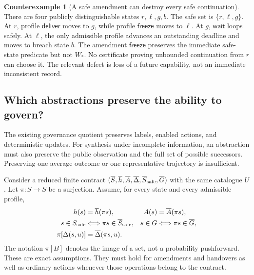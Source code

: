 \documentclass[11pt,letterpaper]{article}
\theoremstyle{plain}
\theoremstyle{definition}
\newtheorem{counterexample}[proposition]{Counterexample}
\theoremstyle{remark}
\begin{document}
\begin{counterexample}[A safe amendment can destroy every safe continuation]\label{ex:amendment-dead-end}
There are four publicly distinguishable states $r,\ell,g,b$. The safe set is $\{r,\ell,g\}$. At $r$, profile $\mathsf{deliver}$ moves to $g$, while profile $\mathsf{freeze}$ moves to $\ell$. At $g$, $\mathsf{wait}$ loops safely. At $\ell$, the only admissible profile advances an outstanding deadline and moves to breach state $b$. The amendment $\mathsf{freeze}$ preserves the immediate safe-state predicate but not $W_*$. No certificate proving unbounded continuation from $r$ can choose it. The relevant defect is loss of a future capability, not an immediate inconsistent record.
\end{counterexample}

\subsection{Which abstractions preserve the ability to govern?}
The existing governance quotient preserves labels, enabled actions, and deterministic updates. For synthesis under incomplete information, an abstraction must also preserve the public observation and the full set of possible successors. Preserving one average outcome or one representative trajectory is insufficient.

Consider a reduced finite contract $(\overline S,\overline h,\overline A,\overline\Delta,\overline S_{\rm safe},\overline G)$ with the same catalogue $U$. Let $\pi:S\to\overline S$ be a surjection. Assume, for every state and every admissible profile,
\begin{align}
h(s)&=\overline h(\pi s), & A(s)&=\overline A(\pi s),\label{eq:synthesis-labels}\\
s\in S_{\rm safe}&\Longleftrightarrow\pi s\in\overline S_{\rm safe}, &
s\in G&\Longleftrightarrow\pi s\in\overline G,\label{eq:synthesis-goals}\\
\pi[\Delta(s,u)]&=\overline\Delta(\pi s,u).&&\label{eq:synthesis-successors}
\end{align}
The notation $\pi[B]$ denotes the image of a set, not a probability pushforward. These are exact assumptions. They must hold for amendments and handovers as well as ordinary actions whenever those operations belong to the contract.
\end{document}
